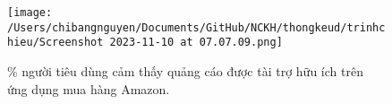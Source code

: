 \documentclass{beamer}
\begin{document}
\begin{frame}
\begin{figure}
    \centering
    \texttt{[image: /Users/chibangnguyen/Documents/GitHub/NCKH/thongkeud/trinhchieu/Screenshot 2023-11-10 at 07.07.09.png]}
    \caption{\centering $\%$ người tiêu dùng cảm thấy quảng cáo được tài trợ hữu ích trên ứng dụng mua hàng Amazon.}
\end{figure}        
\end{frame}
\end{document}
